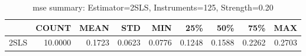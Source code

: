 \begin{table}[ht]
\centering
\caption{mse summary: Estimator=2SLS, Instruments=125, Strength=0.20}
\begin{tabular}{lrrrrrrrr}
\toprule
 & COUNT & MEAN & STD & MIN & 25\% & 50\% & 75\% & MAX \\
\midrule
2SLS & 10.0000 & 0.1723 & 0.0623 & 0.0776 & 0.1248 & 0.1588 & 0.2262 & 0.2703 \\
\bottomrule
\end{tabular}
\end{table}
